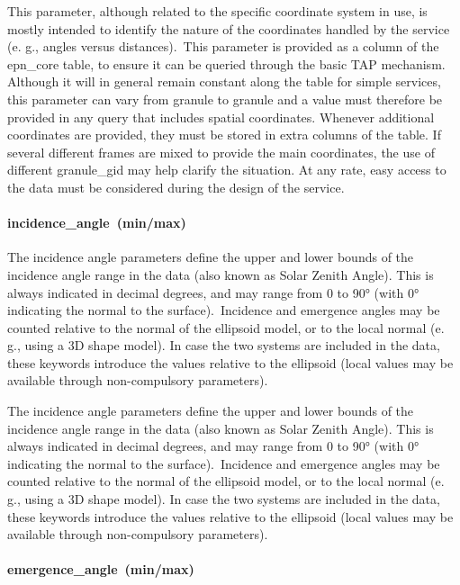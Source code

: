 \documentclass[11pt,a4paper]{ivoa}
\begin{document}
This parameter, although related to the specific coordinate system in use, is mostly intended to identify the nature of the coordinates handled by the service (e. g., angles versus distances). This parameter is provided as a column of the epn\_core table, to ensure it can be queried through the basic TAP mechanism. Although it will in general remain constant along the table for simple services, this parameter can vary from granule to granule and a value must therefore be provided in any query that includes spatial coordinates. Whenever additional coordinates are provided, they must be stored in extra columns of the table. If several different frames are mixed to provide the main coordinates, the use of different granule\_gid may help clarify the situation. At any rate, easy access to the data must be considered during the design of the service. 

\paragraph{incidence\_angle (min/max)}

The incidence angle parameters define the upper and lower bounds of the incidence angle range in the data (also known as Solar Zenith Angle). This is always indicated in decimal degrees, and may range from 0 to 90° (with 0° indicating the normal to the surface). Incidence and emergence angles may be counted relative to the normal of the ellipsoid model, or to the local normal (e. g., using a 3D shape model). In case the two systems are included in the data, these keywords introduce the values relative to the ellipsoid (local values may be available through non-compulsory parameters).

The incidence angle parameters define the upper and lower bounds of the incidence angle range in the data (also known as Solar Zenith Angle). This is always indicated in decimal degrees, and may range from 0 to 90° (with 0° indicating the normal to the surface). Incidence and emergence angles may be counted relative to the normal of the ellipsoid model, or to the local normal (e. g., using a 3D shape model). In case the two systems are included in the data, these keywords introduce the values relative to the ellipsoid (local values may be available through non-compulsory parameters).

\paragraph{emergence\_angle (min/max)}
\end{document}
